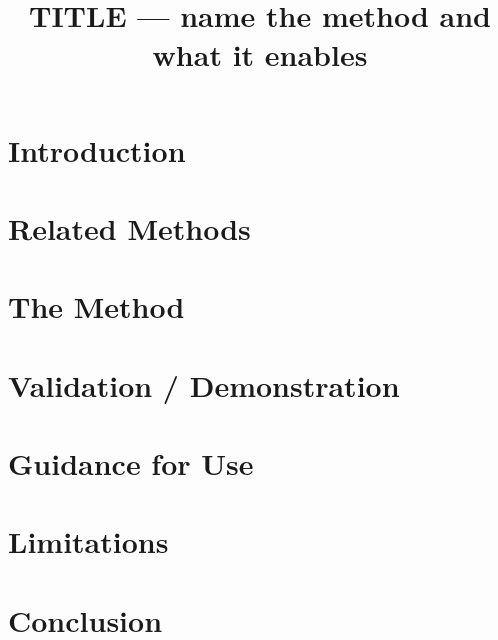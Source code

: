 \documentclass[sigconf,review,anonymous]{acmart}
\begin{document}
\title{TITLE — name the method and what it enables}
\begin{abstract}\end{abstract}
\maketitle
\section{Introduction}        %
\section{Related Methods}
\section{The Method}          %
\section{Validation / Demonstration}  %
\section{Guidance for Use}
\section{Limitations}
\section{Conclusion}

\end{document}
